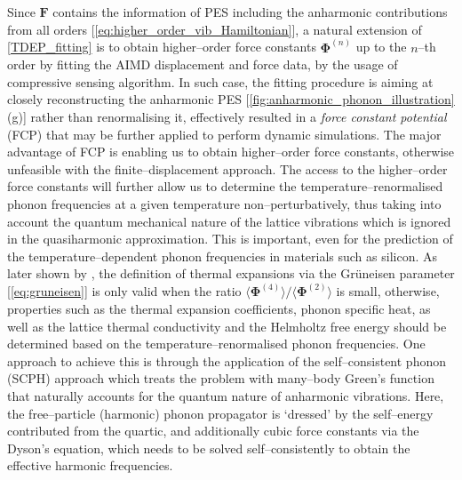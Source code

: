 Since $\bm{F}$ contains the information of PES including the anharmonic contributions from all orders [\cref{eq:higher_order_vib_Hamiltonian}], a natural extension of \cref{TDEP_fitting} is to obtain higher--order force constants $\bm{\Phi}^{(n)}$ up to the $n$--th order by fitting the AIMD displacement and force data,\cite{tadano2014anharmonic,eriksson2019hiphive}  by the usage of compressive sensing algorithm.\cite{zhou2014lattice} In such case, the fitting procedure is aiming at closely reconstructing the anharmonic PES [\cref{fig:anharmonic_phonon_illustration}(g)] rather than renormalising it, effectively resulted in a \emph{force constant potential} (FCP) that may be further applied to perform dynamic simulations.\cite{eriksson2019hiphive,tadano2015self} The major advantage of FCP is enabling us to obtain higher--order force constants,  otherwise unfeasible with the finite--displacement approach. The access to the higher--order force constants will further allow us to determine the temperature--renormalised phonon frequencies at a given temperature non--perturbatively, thus taking into account the quantum mechanical nature of the lattice vibrations which is ignored in the quasiharmonic approximation. This is important, even for the prediction of the temperature--dependent  phonon frequencies in materials such as silicon.\cite{kim2018nuclear} As later shown by \citet{masuki2022anharmonic}, the definition of thermal expansions via the Gr\"{u}neisen parameter [\cref{eq:gruneisen}] is only valid when the ratio $\langle \bm{\Phi}^{(4)}\rangle/\langle \bm{\Phi}^{(2)} \rangle$ is small, otherwise, properties such as the thermal expansion coefficients, phonon specific heat, as well as the lattice thermal conductivity\cite{zhao2021lattice,tadano2015self} and the Helmholtz free energy\cite{oba2019first} should be determined based on the temperature--renormalised phonon frequencies. One approach to achieve this is through the application of the self--consistent phonon (SCPH) approach which treats the problem with many--body Green's function that naturally accounts for the quantum nature of anharmonic vibrations. Here, the free--particle (harmonic) phonon propagator is `dressed' by the self--energy contributed from the quartic,\cite{werthamer1970self,tadano2015self} and additionally cubic\cite{goldman1968improved,oba2019first} force constants via the Dyson's equation, which needs to be solved self--consistently to obtain the effective harmonic frequencies. 
